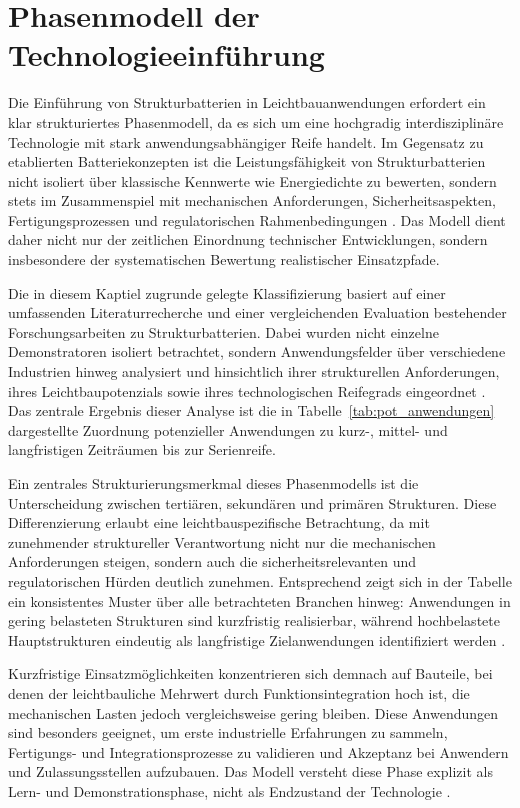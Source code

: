 \section{Phasenmodell der Technologieeinführung}

Die Einführung von Strukturbatterien in Leichtbauanwendungen erfordert ein klar strukturiertes Phasenmodell, da es sich um eine hochgradig interdisziplinäre Technologie mit stark anwendungsabhängiger Reife handelt. Im Gegensatz zu etablierten Batteriekonzepten ist die Leistungsfähigkeit von Strukturbatterien nicht isoliert über klassische Kennwerte wie Energiedichte zu bewerten, sondern stets im Zusammenspiel mit mechanischen Anforderungen, Sicherheitsaspekten, Fertigungsprozessen und regulatorischen Rahmenbedingungen \cite{Asp2021a,Danzi2021,Jaeger2016}. Das Modell dient daher nicht nur der zeitlichen Einordnung technischer Entwicklungen, sondern insbesondere der systematischen Bewertung realistischer Einsatzpfade.



Die in diesem Kaptiel zugrunde gelegte Klassifizierung basiert auf einer umfassenden Literaturrecherche und einer vergleichenden Evaluation bestehender Forschungsarbeiten zu Strukturbatterien. Dabei wurden nicht einzelne Demonstratoren isoliert betrachtet, sondern Anwendungsfelder über verschiedene Industrien hinweg analysiert und hinsichtlich ihrer strukturellen Anforderungen, ihres Leichtbaupotenzials sowie ihres technologischen Reifegrads eingeordnet \cite{Yang2020,Johannisson2019}. Das zentrale Ergebnis dieser Analyse ist die in Tabelle~\ref{tab:pot_anwendungen} dargestellte Zuordnung potenzieller Anwendungen zu kurz-, mittel- und langfristigen Zeiträumen bis zur Serienreife.

Ein zentrales Strukturierungsmerkmal dieses Phasenmodells ist die Unterscheidung zwischen tertiären, sekundären und primären Strukturen. Diese Differenzierung erlaubt eine leichtbauspezifische Betrachtung, da mit zunehmender struktureller Verantwortung nicht nur die mechanischen Anforderungen steigen, sondern auch die sicherheitsrelevanten und regulatorischen Hürden deutlich zunehmen. Entsprechend zeigt sich in der Tabelle ein konsistentes Muster über alle betrachteten Branchen hinweg: Anwendungen in gering belasteten Strukturen sind kurzfristig realisierbar, während hochbelastete Hauptstrukturen eindeutig als langfristige Zielanwendungen identifiziert werden \cite{Kuehnelt2021,Wang2020}.

Kurzfristige Einsatzmöglichkeiten konzentrieren sich demnach auf Bauteile, bei denen der leichtbauliche Mehrwert durch Funktionsintegration hoch ist, die mechanischen Lasten jedoch vergleichsweise gering bleiben. Diese Anwendungen sind besonders geeignet, um erste industrielle Erfahrungen zu sammeln, Fertigungs- und Integrationsprozesse zu validieren und Akzeptanz bei Anwendern und Zulassungsstellen aufzubauen. Das Modell versteht diese Phase explizit als Lern- und Demonstrationsphase, nicht als Endzustand der Technologie \cite{Meng2018}.

